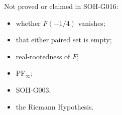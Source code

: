Not proved or claimed in SOH-G016:
\begin{itemize}
 \item whether $F(-1/4)$ vanishes;
 \item that either paired set is empty;
 \item real-rootedness of $F$;
 \item PF$_\infty$;
 \item SOH-G003;
 \item the Riemann Hypothesis.
\end{itemize}
